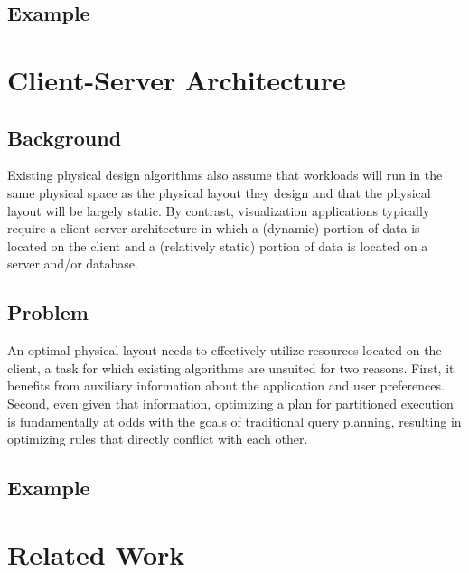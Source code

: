 \subsection{Example}

\section{Client-Server Architecture}
\subsection{Background}
Existing physical design algorithms also assume that workloads will run in the same physical space as the physical layout they design and that the physical layout will be largely static. By contrast, visualization applications typically require a client-server architecture in which a (dynamic) portion of data is located on the client and a (relatively static) portion of data is located on a server and/or database. 

\subsection{Problem}
 An optimal physical layout needs to effectively utilize resources located on the client, a task for which existing algorithms are unsuited for two reasons. First, it benefits from auxiliary information about the application and user preferences. Second, even given that information, optimizing a plan for partitioned execution is fundamentally at odds with the goals of traditional query planning, resulting in optimizing rules that directly conflict with each other.

\subsection{Example}
\section{Related Work}

